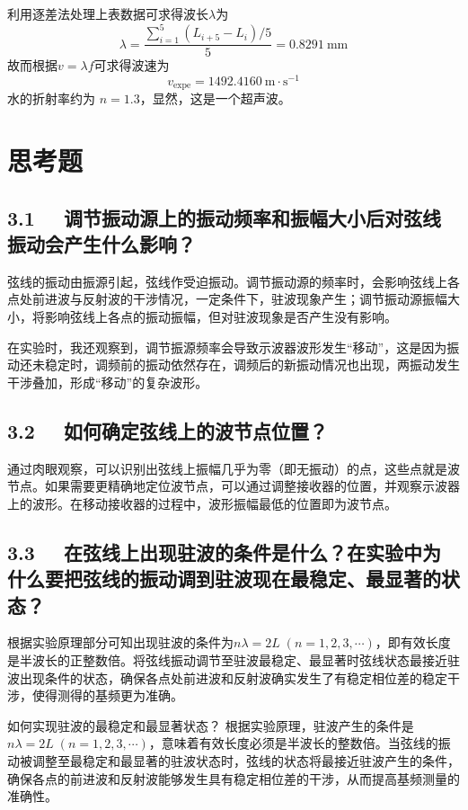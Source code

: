 \documentclass[UTF8]{article}
\theoremstyle{MyLineTheoremStyle} %
\theoremstyle{MyBlockTheoremStyle} %
\theoremstyle{MySubsubsectionStyle} %
\begin{document}
利用逐差法处理上表数据可求得波长$ \lambda $为
\begin{equation}
\lambda=\frac{\sum_{i=1}^{5}(L_{i+5}-L_i)/5}{5}= 0.8291 \ \mathrm{mm}
\end{equation}
故而根据$ v=\lambda f $可求得波速为
\begin{equation}
    v_{\text{expe}} = 1492.4160\ \mathrm{m \cdot s^{-1}}
\end{equation}
水的折射率约为 $n = 1.3$，显然，这是一个超声波。


\section{思考题}

\subsection*{3.1 \ \ 调节振动源上的振动频率和振幅大小后对弦线振动会产生什么影响？}

弦线的振动由振源引起，弦线作受迫振动。调节振动源的频率时，会影响弦线上各点处前进波与反射波的干涉情况，一定条件下，驻波现象产生；调节振动源振幅大小，将影响弦线上各点的振动振幅，但对驻波现象是否产生没有影响。

在实验时，我还观察到，调节振源频率会导致示波器波形发生“移动”，这是因为振动还未稳定时，调频前的振动依然存在，调频后的新振动情况也出现，两振动发生干涉叠加，形成“移动”的复杂波形。

\subsection*{3.2 \ \  如何确定弦线上的波节点位置？}
通过肉眼观察，可以识别出弦线上振幅几乎为零（即无振动）的点，这些点就是波节点。如果需要更精确地定位波节点，可以通过调整接收器的位置，并观察示波器上的波形。在移动接收器的过程中，波形振幅最低的位置即为波节点。

\subsection*{3.3 \ \  在弦线上出现驻波的条件是什么？在实验中为什么要把弦线的振动调到驻波现在最稳定、最显著的状态？}
根据实验原理部分可知出现驻波的条件为$ n\lambda = 2L\;(n=1,2,3,\cdots) $，即有效长度是半波长的正整数倍。将弦线振动调节至驻波最稳定、最显著时弦线状态最接近驻波出现条件的状态，确保各点处前进波和反射波确实发生了有稳定相位差的稳定干涉，使得测得的基频更为准确。

如何实现驻波的最稳定和最显著状态？
根据实验原理，驻波产生的条件是 $ n\lambda = 2L\;(n=1,2,3,\cdots) $，意味着有效长度必须是半波长的整数倍。当弦线的振动被调整至最稳定和最显著的驻波状态时，弦线的状态将最接近驻波产生的条件，确保各点的前进波和反射波能够发生具有稳定相位差的干涉，从而提高基频测量的准确性。
\end{document}
